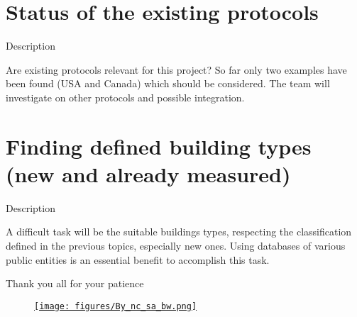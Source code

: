 \documentclass[xcolor=svgnames]{beamer}
\newcommand{\1}{\'{\i}}
\begin{document}
\section[Protocols]{Status of the existing protocols}

\frame{\tableofcontents[currentsection]}

\begin{frame}{Description}

Are existing protocols relevant for this project? So far only two examples have been found (USA and Canada) which should be considered. The team will investigate on other protocols and possible integration.

\end{frame}

\section[Defined \ldots]{Finding defined building types (new and already measured)}

\frame{\tableofcontents[currentsection]}

\begin{frame}{Description}

A difficult task will be the suitable buildings types, respecting the classification defined in the previous topics, especially new ones. Using databases of various public entities is an essential benefit to accomplish this task. 

\end{frame}

\begin{frame}{Thank you all for your patience}

\centering

\end{frame}

\begin{frame}

\begin{figure}

\href{http://creativecommons.org/licenses/by-nc-sa/4.0/}{\texttt{[image: figures/By\_nc\_sa\_bw.png]}}

\end{figure}

\end{frame}
\end{document}
